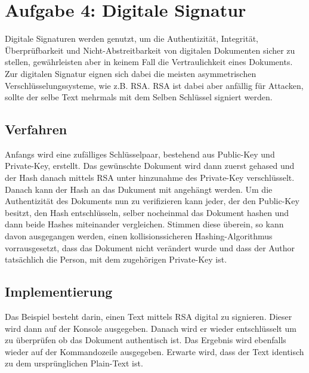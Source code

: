 \documentclass[12pt]{article}
\begin{document}
\section{Aufgabe 4: Digitale Signatur}
Digitale Signaturen werden genutzt, um die Authentizität, Integrität,
Überprüfbarkeit und Nicht-Abstreitbarkeit von digitalen
Dokumenten sicher zu stellen, gewährleisten aber in keinem Fall die Vertraulichkeit eines
Dokuments. Zur digitalen Signatur eignen sich dabei die meisten
asymmetrischen Verschlüsselungssysteme, wie z.B. RSA. RSA ist dabei aber anfällig für
Attacken, sollte der selbe Text mehrmals mit dem Selben Schlüssel signiert
werden.

\subsection{Verfahren}
Anfangs wird eine zufälliges Schlüsselpaar, bestehend aus Public-Key und
Private-Key, erstellt. Das gewünschte Dokument wird dann zuerst gehased 
und der Hash danach mittels RSA unter hinzunahme des Private-Key verschlüsselt.
Danach kann der Hash an das Dukument mit angehängt werden. Um die Authentizität
des Dokuments nun zu verifizieren kann jeder, der den Public-Key besitzt, den
Hash entschlüsseln, selber nocheinmal das Dokument hashen und dann beide Hashes
miteinander vergleichen. Stimmen diese überein, so kann davon ausgegangen
werden, einen kollisionssicheren Hashing-Algorithmus vorrausgesetzt, dass das
Dokument nicht verändert wurde und dass der Author tatsächlich die Person, mit
dem zugehörigen Private-Key ist.

\subsection{Implementierung}
Das Beispiel besteht darin, einen Text mittels RSA digital zu signieren. Dieser
wird dann auf der Konsole ausgegeben. Danach wird er wieder entschlüsselt um zu
überprüfen ob das Dokument authentisch ist. Das Ergebnis wird ebenfalls wieder
auf der Kommandozeile ausgegeben. Erwarte wird, dass der Text identisch zu dem
ursprünglichen Plain-Text ist.
\end{document}
